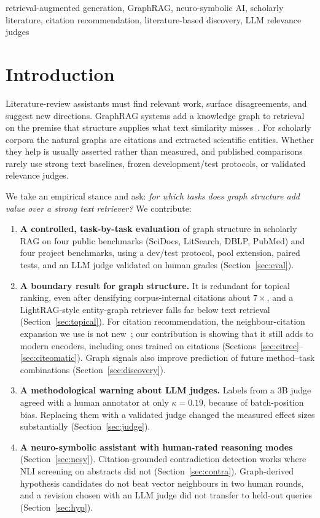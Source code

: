 \documentclass[conference]{IEEEtran}
\begin{document}
\begin{IEEEkeywords}
retrieval-augmented generation, GraphRAG, neuro-symbolic AI, scholarly literature, citation recommendation, literature-based discovery, LLM relevance judges
\end{IEEEkeywords}

\section{Introduction}

Literature-review assistants must find relevant work, surface disagreements, and suggest new directions. GraphRAG systems add a knowledge graph to retrieval on the premise that structure supplies what text similarity misses~\cite{edge2024graphrag}. For scholarly corpora the natural graphs are citations and extracted scientific entities. Whether they help is usually asserted rather than measured, and published comparisons rarely use strong text baselines, frozen development/test protocols, or validated relevance judges.

We take an empirical stance and ask: \emph{for which tasks does graph structure add value over a strong text retriever?} We contribute:
\begin{enumerate}
\item \textbf{A controlled, task-by-task evaluation} of graph structure in scholarly RAG on four public benchmarks (SciDocs, LitSearch, DBLP, PubMed) and four project benchmarks, using a dev/test protocol, pool extension, paired tests, and an LLM judge validated on human grades (Section~\ref{sec:eval}).
\item \textbf{A boundary result for graph structure.} It is redundant for topical ranking, even after densifying corpus-internal citations about $7\times$, and a LightRAG-style entity-graph retriever falls far below text retrieval (Section~\ref{sec:topical}). For citation recommendation, the neighbour-citation expansion we use is not new~\cite{strohman2007citations,bhagavatula2018content}; our contribution is showing that it still adds to modern encoders, including ones trained on citations (Sections~\ref{sec:citrec}--\ref{sec:citeomatic}). Graph signals also improve prediction of future method--task combinations (Section~\ref{sec:discovery}).
\item \textbf{A methodological warning about LLM judges.} Labels from a 3B judge agreed with a human annotator at only $\kappa = 0.19$, because of batch-position bias. Replacing them with a validated judge changed the measured effect sizes substantially (Section~\ref{sec:judge}).
\item \textbf{A neuro-symbolic assistant with human-rated reasoning modes} (Section~\ref{sec:nesy}). Citation-grounded contradiction detection works where NLI screening on abstracts did not (Section~\ref{sec:contra}). Graph-derived hypothesis candidates do not beat vector neighbours in two human rounds, and a revision chosen with an LLM judge did not transfer to held-out queries (Section~\ref{sec:hyp}).
\end{enumerate}
\end{document}

